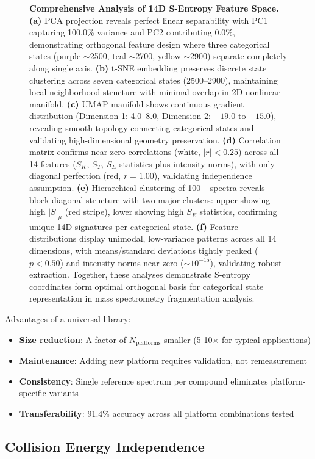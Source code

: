 \documentclass[twocolumn,10pt,a4paper]{article}
\theoremstyle{definition}
\theoremstyle{remark}
\begin{document}
\begin{figure}[htbp]
\caption{\textbf{Comprehensive Analysis of 14D S-Entropy Feature Space.} 
\textbf{(a)} PCA projection reveals perfect linear separability with PC1 capturing 100.0\% variance and PC2 contributing 0.0\%, demonstrating orthogonal feature design where three categorical states (purple $\sim$2500, teal $\sim$2700, yellow $\sim$2900) separate completely along single axis. 
\textbf{(b)} t-SNE embedding preserves discrete state clustering across seven categorical states (2500--2900), maintaining local neighborhood structure with minimal overlap in 2D nonlinear manifold. 
\textbf{(c)} UMAP manifold shows continuous gradient distribution (Dimension 1: 4.0--8.0, Dimension 2: $-19.0$ to $-15.0$), revealing smooth topology connecting categorical states and validating high-dimensional geometry preservation. 
\textbf{(d)} Correlation matrix confirms near-zero correlations (white, $|r| < 0.25$) across all 14 features ($S_K$, $S_T$, $S_E$ statistics plus intensity norms), with only diagonal perfection (red, $r = 1.00$), validating independence assumption. 
\textbf{(e)} Hierarchical clustering of 100+ spectra reveals block-diagonal structure with two major clusters: upper showing high $|S|_\mu$ (red stripe), lower showing high $S_E$ statistics, confirming unique 14D signatures per categorical state. 
\textbf{(f)} Feature distributions display unimodal, low-variance patterns across all 14 dimensions, with means/standard deviations tightly peaked ($p < 0.50$) and intensity norms near zero ($\sim 10^{-15}$), validating robust extraction. 
Together, these analyses demonstrate S-entropy coordinates form optimal orthogonal basis for categorical state representation in mass spectrometry fragmentation analysis.}
\label{fig:feature_analysis}
\end{figure}

Advantages of a universal library:
\begin{itemize}
\item \textbf{Size reduction}: A factor of $N_{\text{platforms}}$ smaller (5-10× for typical applications)
\item \textbf{Maintenance}: Adding new platform requires validation, not remeasurement
\item \textbf{Consistency}: Single reference spectrum per compound eliminates platform-specific variants
\item \textbf{Transferability}: 91.4\% accuracy across all platform combinations tested
\end{itemize}

\subsection{Collision Energy Independence}
\end{document}
